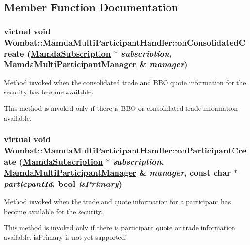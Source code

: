 \subsection{Member Function Documentation}
\hypertarget{classWombat_1_1MamdaMultiParticipantHandler_6882729b5fea8d62996e3c1de7f1d2f7}{
\subsubsection[onConsolidatedCreate]{\setlength{\rightskip}{0pt plus 5cm}virtual void Wombat::Mamda\-Multi\-Participant\-Handler::on\-Consolidated\-Create (\hyperlink{classWombat_1_1MamdaSubscription}{Mamda\-Subscription} $\ast$ {\em subscription}, \hyperlink{classWombat_1_1MamdaMultiParticipantManager}{Mamda\-Multi\-Participant\-Manager} \& {\em manager})}}
\label{classWombat_1_1MamdaMultiParticipantHandler_6882729b5fea8d62996e3c1de7f1d2f7}


Method invoked when the consolidated trade and BBO quote information for the security has become available. 

This method is invoked only if there is BBO or consolidated trade information available. \hypertarget{classWombat_1_1MamdaMultiParticipantHandler_da40bbe1aa0fe168feb193aa8f2e8cfd}{
\subsubsection[onParticipantCreate]{\setlength{\rightskip}{0pt plus 5cm}virtual void Wombat::Mamda\-Multi\-Participant\-Handler::on\-Participant\-Create (\hyperlink{classWombat_1_1MamdaSubscription}{Mamda\-Subscription} $\ast$ {\em subscription}, \hyperlink{classWombat_1_1MamdaMultiParticipantManager}{Mamda\-Multi\-Participant\-Manager} \& {\em manager}, const char $\ast$ {\em particpant\-Id}, bool {\em is\-Primary})}}
\label{classWombat_1_1MamdaMultiParticipantHandler_da40bbe1aa0fe168feb193aa8f2e8cfd}


Method invoked when the trade and quote information for a participant has become available for the security. 

This method is invoked only if there is participant quote or trade information available. is\-Primary is not yet supported! 
